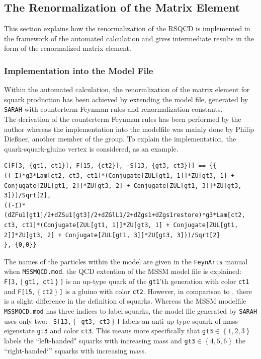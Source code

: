 \subsection{The Renormalization of the Matrix Element}\label{sec:MatrixElRen}
This section explains how the renormalization of the RSQCD is implemented in the framework of the automated calculation and gives intermediate results in the form of the renormalized matrix element.

\subsubsection{Implementation into the Model File}
Within the automated calculation, the renormlization of the matrix element for squark production has been achieved by extending the model file, generated by \texttt{SARAH} with counterterm Feynman rules and renormalization constants.\\ 
The derivation of the counterterm Feynman rules has been performed by the author whereas the implementation into the modelfile was mainly done by Philip Dießner, another member of the group. To explain the implementation, the quark-squark-gluino vertex is considered, as an example.
\begin{lstlisting}[style=MyMathematica]
C[F[3, {gt1, ct1}], F[15, {ct2}], -S[13, {gt3, ct3}]] == {{
((-I)*g3*Lam[ct2, ct3, ct1]*(Conjugate[ZUL[gt1, 1]]*ZU[gt3, 1] + Conjugate[ZUL[gt1, 2]]*ZU[gt3, 2] + Conjugate[ZUL[gt1, 3]]*ZU[gt3, 3]))/Sqrt[2],
((-I)*(dZFu1[gt1]/2+dZSu1[gt3]/2+dZGlL1/2+dZgs1+dZgs1restore)*g3*Lam[ct2, ct3, ct1]*(Conjugate[ZUL[gt1, 1]]*ZU[gt3, 1] + Conjugate[ZUL[gt1, 2]]*ZU[gt3, 2] + Conjugate[ZUL[gt1, 3]]*ZU[gt3, 3]))/Sqrt[2]
}, {0,0}}
\end{lstlisting}
The names of the particles within the model are given in the \texttt{FeynArts} manual\cite{FeynArtsManual} when  \texttt{MSSMQCD.mod}, the QCD extention of the MSSM model file is explained:\\ 
\mbox{\texttt{F[3,$\left\{ \right.$gt1, ct1$\left.\right\}$]}} is an up-type quark of the \texttt{gt1}'th generation with color \texttt{ct1} and \texttt{F[15,$\left\{ \right.$ct2$\left.\right\}$]} is a gluino with color \texttt{ct2}. However, in comparison to \cite{FeynArtsManual}, there is a slight difference in the definition of squarks. Whereas the MSSM modelfile \texttt{MSSMQCD.mod} has three indices to label squarks, the model file generated by \texttt{SARAH} uses only two: \texttt{-S[13,$\left\{ \right.$ gt3, ct3$\left.\right\}$]} labels an anti up-type squark of mass eigenstate \texttt{gt3} and color \texttt{ct3}. This means more specifically that \texttt{gt3}$\in \left\{ 1,2,3 \right\}$ labels the ``left-handed" squarks with increasing mass and \texttt{gt3}$\in \left\{ 4,5,6 \right\}$ the ``right-handed`'' squarks with increasing mass.\\
